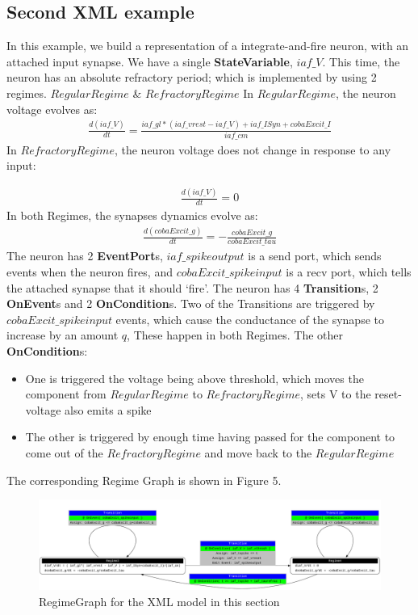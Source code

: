 \documentclass{article}
\newcommand{\StateVariable}{{\bf{StateVariable}}\xspace}
\newcommand{\EventPorts}{{\bf{EventPort}}s\xspace}
\newcommand{\Transitions}{{\bf{Transition}}s\xspace}
\newcommand{\OnEvents}{{\bf{OnEvent}}s\xspace}
\newcommand{\OnConditions}{{\bf{OnCondition}}s\xspace}
\begin{document}
\newpage
\subsection{Second XML example}

In this example, we build a representation of a integrate-and-fire neuron, with
an attached input synapse.
\noindent
We have a single \StateVariable, $iaf\_V$.
This time, the neuron has an absolute refractory period; which is implemented
by using 2 regimes. $RegularRegime$ \& $RefractoryRegime$
In $RegularRegime$, the neuron voltage evolves as:
\begin{eqnarray}
\frac{d(iaf\_V)}{dt} = \frac{ iaf\_gl*( iaf\_vrest - iaf\_V ) + iaf\_ISyn+cobaExcit\_I} {iaf\_cm}
\end{eqnarray}
In $RefractoryRegime$, the neuron voltage does not change in response to any
input:

\begin{eqnarray}
\frac{d(iaf\_V)}{dt} = 0
\end{eqnarray}
\noindent
In both Regimes, the synapses dynamics evolve as:
\begin{eqnarray}
\frac{d(cobaExcit\_g)}{dt} = - \frac{cobaExcit\_g}{cobaExcit\_tau}
\end{eqnarray}
\noindent
The neuron has 2 \EventPorts, $iaf\_spikeoutput$ is a send port, which sends
events when the neuron fires, and $cobaExcit\_spikeinput$ is a recv port,
which tells the attached synapse that it should `fire'.
\noindent
The neuron has 4 \Transitions, 2 \OnEvents  and 2 \OnConditions.
Two of the Transitions are triggered by $cobaExcit\_spikeinput$ events, which
cause the conductance of the synapse to increase by an amount $q$, These
happen in both Regimes.
The other \OnConditions:
\begin{itemize}
\item One is triggered the voltage being above threshold, which moves the
component from $RegularRegime$ to $RefractoryRegime$, sets V to the
reset-voltage also emits a spike
\item The other is triggered by enough time having passed for the component
to come out of the $RefractoryRegime$ and move back to the $RegularRegime$
\end{itemize}

The corresponding Regime Graph is shown in Figure 5.

\begin{figure}[htb!]
\center
\includegraphics[width=14cm]{figures/demo2_Coba1_trnasition.pdf}
\protect\caption{RegimeGraph for the XML model in this section}
\label{fig:EX2_trans}
\end{figure}
\end{document}
